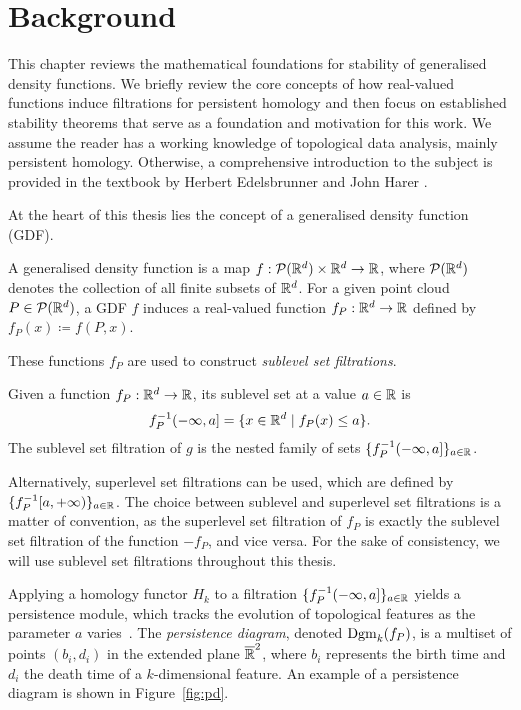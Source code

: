 \chapter{Background}
\label{chap:background}

This chapter reviews the mathematical foundations for stability of generalised
density functions. We briefly review the core concepts of how real-valued
functions induce filtrations for persistent homology and then focus on
established stability theorems that serve as a foundation and motivation for
this work. We assume the reader has a working knowledge of topological data
analysis, mainly persistent homology. Otherwise, a comprehensive introduction to
the subject is provided in the textbook by Herbert Edelsbrunner and John Harer
\cite{edelsbrunner2010computational}.

At the heart of this thesis lies the concept of a generalised density function (GDF).
\begin{definition}
    A generalised density function is a map $f : \mathcal{P}(\mathbb{R}^d) \times \mathbb{R}^d
    \to \mathbb{R}$,
    where $\mathcal{P}(\mathbb{R}^d)$ denotes the collection of all finite subsets of
    $\mathbb{R}^d$. For a given point cloud $P \in \mathcal{P}(\mathbb{R}^d)$, a GDF $f$ induces a
    real-valued function $f_P : \mathbb{R}^d \to \mathbb{R}$ defined by $f_P(x) \coloneqq f(P, x)$.
\end{definition}

These functions $f_P$ are used to construct \emph{sublevel set filtrations}.
\begin{definition}
    Given a function $f_P : \mathbb{R}^d \to \mathbb{R}$, its sublevel set at a value $a \in \mathbb{R}$ is
    \begin{equation}
        f_P^{-1}(-\infty, a] = \{ x \in \mathbb{R}^d \mid f_P(x) \leq a \}.
    \end{equation}
    The sublevel set filtration of $g$ is the nested family of sets
    $\{f_P^{-1}(-\infty, a]\}_{a \in \mathbb{R}}$.
\end{definition}
Alternatively, superlevel set filtrations can be used, which are defined by
$\{f_P^{-1}[a, +\infty)\}_{a \in \mathbb{R}}$. The choice between sublevel and superlevel
set filtrations is a matter of convention, as the superlevel set filtration of
$f_P$ is exactly the sublevel set filtration of the function $-f_P$, and vice
versa. For the sake of consistency, we will use sublevel set filtrations
throughout this thesis.

Applying a homology functor $H_k$ to a filtration $\{f_P^{-1}(-\infty, a]\}_{a \in \mathbb{R}}$
yields a persistence module, which tracks the evolution of topological features
as the parameter $a$ varies~\cite{edelsbrunner2010computational}. The
\emph{persistence diagram}, denoted $\operatorname{Dgm}_k(f_P)$, is a multiset of points
$(b_i, d_i)$ in the extended plane $\overline{\mathbb{R}}^2$, where $b_i$ represents the
birth time and $d_i$ the death time of a $k$-dimensional feature. An example of
a persistence diagram is shown in Figure~\ref{fig:pd}.

